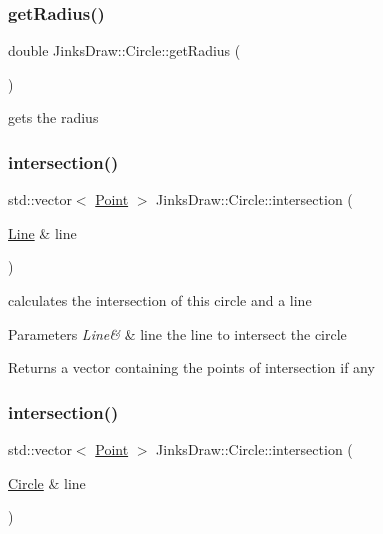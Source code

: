 \subsubsection{\texorpdfstring{get\+Radius()}{getRadius()}}
{\footnotesize\ttfamily double Jinks\+Draw\+::\+Circle\+::get\+Radius (\begin{DoxyParamCaption}{ }\end{DoxyParamCaption})}



gets the radius 

\mbox{\label{class_jinks_draw_1_1_circle_aaea3c11d7267e06784145ce450be49a8}} 
\subsubsection{\texorpdfstring{intersection()}{intersection()}\hspace{0.1cm}{\footnotesize\ttfamily [1/2]}}
{\footnotesize\ttfamily std\+::vector$<$ \mbox{\hyperlink{class_jinks_draw_1_1_point}{Point}} $>$ Jinks\+Draw\+::\+Circle\+::intersection (\begin{DoxyParamCaption}\item[{\mbox{\hyperlink{class_jinks_draw_1_1_line}{Line}} \&}]{line }\end{DoxyParamCaption})}



calculates the intersection of this circle and a line 


\begin{DoxyParams}{Parameters}
{\em Line\&} & line the line to intersect the circle \\
\hline
\end{DoxyParams}
\begin{DoxyReturn}{Returns}
a vector containing the points of intersection if any 
\end{DoxyReturn}
\mbox{\label{class_jinks_draw_1_1_circle_a6b1158a9744529ce7198b66d1bcf8973}} 
\subsubsection{\texorpdfstring{intersection()}{intersection()}\hspace{0.1cm}{\footnotesize\ttfamily [2/2]}}
{\footnotesize\ttfamily std\+::vector$<$ \mbox{\hyperlink{class_jinks_draw_1_1_point}{Point}} $>$ Jinks\+Draw\+::\+Circle\+::intersection (\begin{DoxyParamCaption}\item[{\mbox{\hyperlink{class_jinks_draw_1_1_circle}{Circle}} \&}]{line }\end{DoxyParamCaption})}



